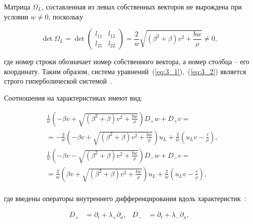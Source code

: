 Матрица $\Omega_L$, составленная из левых собственных векторов не вырождена при условии $w \neq 0$, поскольку

\begin{equation}

\det \Omega_L = \det \left(\begin{matrix}l_{11} & l_{12} \\ l_{21} & l_{22} \end{matrix}\right) = \frac{2}{w}\sqrt{\left(\beta^2 + \beta\right) v^2 + \frac{bw}{\rho}} \neq 0,

\label{eq:3_8}

\end{equation}

где номер строки обозначает номер собственного вектора, а номер столбца – его координату. Таким образом, система уравнений~(\ref{eq:3_1}),~(\ref{eq:3_2}) является строго гиперболической системой~\cite{kulik1}.



Соотношения на характеристиках имеют вид:

\begin{align}

&\frac{1}{w}\left(-\beta v + \sqrt{\left(\beta^2 + \beta\right) v^2 + \frac{bw}{\rho}}\right) D_+ w + D_+ v  = \nonumber \\

& = -\frac{2}{w}\left(-\beta v + \sqrt{\left(\beta^2 + \beta\right) v^2 + \frac{bw}{\rho}}\right) u_L + \frac{2}{w} \left(u_L v - \frac{\tau}{\rho}\right), \label{eq:3_9} \\

&\frac{1}{w}\left(-\beta v - \sqrt{\left(\beta^2 + \beta\right) v^2 + \frac{bw}{\rho}}\right) D_- w + D_- v  = \nonumber \\

& = \frac{2}{w}\left(\beta v + \sqrt{\left(\beta^2 + \beta\right) v^2 + \frac{bw}{\rho}}\right) u_L + \frac{2}{w} \left(u_L v - \frac{\tau}{\rho}\right), \label{eq:3_10} \\

\end{align}

где введены операторы внутреннего дифференцирования вдоль характеристик~\cite{ovsyan1}:

\begin{align}

 D_+&= \partial_t + \lambda_+\partial_x, & D_-&= \partial_t + \lambda_-\partial_x, \nonumber

\end{align}

